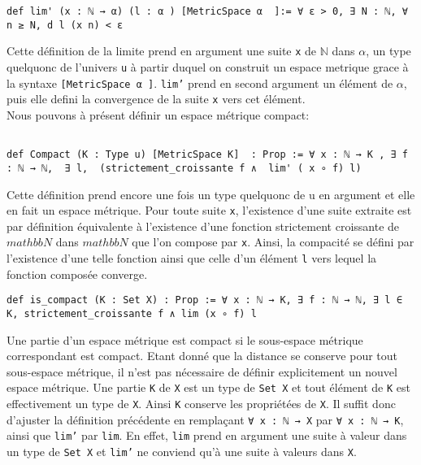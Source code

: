 \documentclass[a4paper, 12pt]{article}
\newcommand{\lean}[1]{\texttt{#1}}
\begin{document}
\vspace{\baselineskip} 
\vspace{\baselineskip} 
 
\begin{verbatim}
def lim' (x : ℕ → α) (l : α ) [MetricSpace α  ]:= ∀ ε > 0, ∃ N : ℕ, ∀ n ≥ N, d l (x n) < ε
\end{verbatim}

Cette définition de la limite prend en argument une suite \lean{x} de $\mathbb{N}$ dans $\alpha$, un type quelquonc de l'univers \lean{u} à partir duquel on construit un espace metrique grace à la syntaxe \lean{[MetricSpace α  ]}. \lean{lim'} prend en second argument un élément de $\alpha$, puis elle defini la convergence de la suite \lean{x} vers cet élément.\\

Nous pouvons à présent définir un espace métrique compact:

\begin{verbatim}

def Compact (K : Type u) [MetricSpace K]  : Prop := ∀ x : ℕ → K , ∃ f : ℕ → ℕ,  ∃ l,  (strictement_croissante f ∧  lim' ( x ∘ f) l)
\end{verbatim}

Cette définition prend encore une fois un type quelquonc  de u en argument et elle en fait un espace métrique. Pour toute suite \lean{x}, l'existence d'une suite extraite est par définition équivalente à l'existence d'une fonction strictement croissante de $mathbb{N} $ dans $mathbb{N} $  que l'on compose par \lean{x}. Ainsi, la compacité se défini  par l'existence d'une telle fonction ainsi que celle d'un élément  \lean{l} vers lequel la fonction composée converge.

\begin{verbatim}
def is_compact (K : Set X) : Prop := ∀ x : ℕ → K, ∃ f : ℕ → ℕ, ∃ l ∈ K, strictement_croissante f ∧ lim (x ∘ f) l

\end{verbatim}

Une partie d'un espace métrique est compact si le sous-espace métrique correspondant est compact. Etant donné que la distance se conserve pour tout sous-espace métrique, il n'est pas nécessaire de définir explicitement un nouvel espace métrique. Une partie \lean{K} de \lean{X} est un type de \lean{Set X} et tout élément de  \lean{K} est effectivement un type de \lean{X}. Ainsi  \lean{K} conserve les propriétées de \lean{X}. Il suffit donc d'ajuster la définition précédente en remplaçant \lean{∀ x : ℕ → X} par \lean{∀ x : ℕ → K}, ainsi que \lean{lim'} par \lean{lim}. En effet, \lean{lim} prend en argument une suite à valeur dans un type de \lean{Set X} et \lean{lim'} ne conviend qu'à une suite à valeurs dans \lean{X}.
\end{document}
